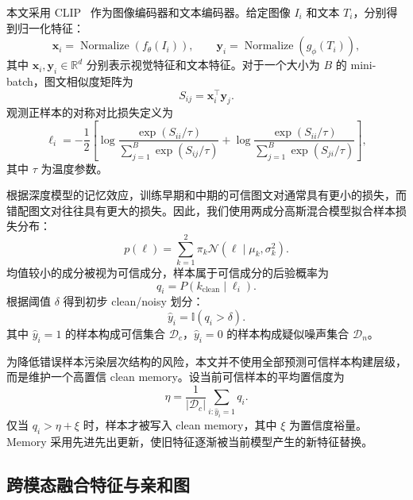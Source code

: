 本文采用 CLIP~\cite{clip} 作为图像编码器和文本编码器。给定图像 $I_i$ 和文本 $T_i$，分别得到归一化特征：
\begin{equation}
    \boldsymbol{x}_i = \operatorname{Normalize}(f_{\theta}(I_i)),
    \qquad
    \boldsymbol{y}_i = \operatorname{Normalize}(g_{\phi}(T_i)),
\end{equation}
其中 $\boldsymbol{x}_i,\boldsymbol{y}_i\in\mathbb{R}^{d}$ 分别表示视觉特征和文本特征。对于一个大小为 $B$ 的 mini-batch，图文相似度矩阵为
\begin{equation}
    S_{ij}=\boldsymbol{x}_i^{\top}\boldsymbol{y}_j .
\end{equation}
观测正样本的对称对比损失定义为
\begin{equation}
    \ell_i
    =
    -\frac{1}{2}
    \left[
    \log\frac{\exp(S_{ii}/\tau)}
    {\sum_{j=1}^{B}\exp(S_{ij}/\tau)}
    +
    \log\frac{\exp(S_{ii}/\tau)}
    {\sum_{j=1}^{B}\exp(S_{ji}/\tau)}
    \right],
\end{equation}
其中 $\tau$ 为温度参数。

根据深度模型的记忆效应，训练早期和中期的可信图文对通常具有更小的损失，而错配图文对往往具有更大的损失。因此，我们使用两成分高斯混合模型拟合样本损失分布：
\begin{equation}
    p(\ell)=\sum_{k=1}^{2}\pi_k\mathcal{N}(\ell\mid\mu_k,\sigma_k^2).
\end{equation}
均值较小的成分被视为可信成分，样本属于可信成分的后验概率为
\begin{equation}
    q_i=P(k_{\mathrm{clean}}\mid \ell_i).
\end{equation}
根据阈值 $\delta$ 得到初步 clean/noisy 划分：
\begin{equation}
    \hat{y}_i=\mathbb{I}(q_i>\delta).
\end{equation}
其中 $\hat{y}_i=1$ 的样本构成可信集合 $\mathcal{D}_c$，$\hat{y}_i=0$ 的样本构成疑似噪声集合 $\mathcal{D}_n$。

为降低错误样本污染层次结构的风险，本文并不使用全部预测可信样本构建层级，而是维护一个高置信 clean memory。设当前可信样本的平均置信度为
\begin{equation}
    \eta=\frac{1}{|\mathcal{D}_c|}\sum_{i:\hat{y}_i=1}q_i.
\end{equation}
仅当 $q_i>\eta+\xi$ 时，样本才被写入 clean memory，其中 $\xi$ 为置信度裕量。Memory 采用先进先出更新，使旧特征逐渐被当前模型产生的新特征替换。

\subsection{跨模态融合特征与亲和图}

